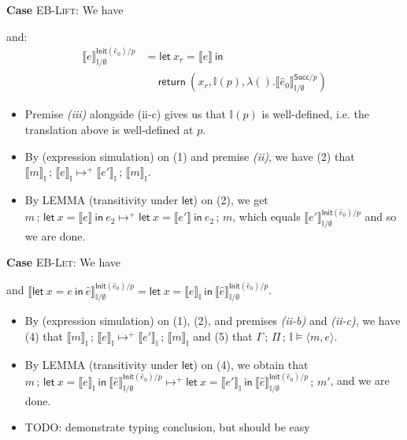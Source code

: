 \documentclass{article}
\newcommand{\mf}[1]{\mathsf{#1}}
\newcommand{\mc}[1]{\mathcal{#1}}
\newcommand{\tb}[1]{\textbf{#1}}
\newcommand{\ts}[1]{\textsc{#1}}
\newcommand{\semi}{\,;\,}
\newcommand{\hl}[1]{\colorbox{LightGoldenrod1}{#1}}
\newcommand{\llrr}[1]{\llbracket #1 \rrbracket}
\newcommand{\pair}[2]{\langle #1, #2 \rangle}
\newcommand{\ptp}{A}
\newcommand{\tview}{\mf{View}}
\newcommand{\estep}[4]{#1 \semi #2 \mapsto #3 \semi #4}
\newcommand{\bstep}[6]{#1 \semi #2 \mapsto^{#3}_{#4} #5 \semi #6}
\newcommand{\Ell}{\mc{L}}
\newcommand{\I}{\mathbb{I}}
\newcommand{\elet}[3]{\mf{let}\ #1 = #2\ \mf{in}\ #3}
\newcommand{\eret}[1]{\mf{return}\ #1}
\begin{document}
\begin{theorem}
\begin{Proof}
\tb{Case} \ts{EB-Lift}: We have
and:
\begin{align*}
\llrr{e}^{\mf{Init}(\hat{e}_0)/p}_{\I/\emptyset}
&= \elet{x_r}{\llrr{e}}{\\
  &\quad\ \eret{(x_r,\I(p),\lambda ().\llrr{\hat{e}_0}
  ^{\mf{Succ}/p}_{\I/\emptyset})}
}
\end{align*}
\begin{itemize}
\item Premise \emph{(iii)} alongside (ii-c)
gives us that $\I(p)$ is well-defined,
i.e. the translation above is well-defined at $p$.
\item By  (expression simulation) on (1)
and premise \emph{(ii)},
we have (2) that $\llrr{m}_\I \semi \llrr{e}_\I 
\mapsto^+ \llrr{e'}_\I \semi \llrr{m}_\I$.
\item By LEMMA (transitivity under $\mf{let}$) on (2),
we get $m \semi \elet{x}{\llrr{e}}{e_2}
\mapsto^+ \elet{x}{\llrr{e'}}{e_2} \semi m$,
which equals $\llrr{e'}^{\mf{Init}(\hat{e}_0)/p}_{\I/\emptyset}$
and so we are done.
\end{itemize}

\tb{Case} \ts{EB-Let}: We have
and
$\llrr{\elet{x}{e}{\hat{e}}}^{\mf{Init}(\hat{e}_0)/p}_{\I/\emptyset}
= \elet{x}{\llrr{e}_\I}{\llrr{\hat{e}}^{\mf{Init}(\hat{e}_0)/p}_{\I/\emptyset}}$.
\begin{itemize}
\item By  (expression simulation) on (1),
(2),
and premises \emph{(ii-b)} and \emph{(ii-c)},
we have (4) that $\llrr{m}_\I \semi \llrr{e}_\I 
\mapsto^+ \llrr{e'}_\I \semi \llrr{m}_\I$
and (5) that $\Gamma \semi \Pi \semi \I \vDash \pair{m}{e}$.
\item By LEMMA (transitivity under $\mf{let}$) on (4),
we obtain that 
$m \semi \elet{x}{\llrr{e}_\I}
{\llrr{\hat{e}}^{\mf{Init}(\hat{e}_0)/p}_{\I/\emptyset}}
\mapsto^+
\elet{x}{\llrr{e'}_\I}
{\llrr{\hat{e}}^{\mf{Init}(\hat{e}_0)/p}_{\I/\emptyset}}
\semi m'$, and we are done.
\item \hl{TODO}: demonstrate typing conclusion, but should be easy
\end{itemize}


\end{Proof}
\end{theorem}
\end{document}
